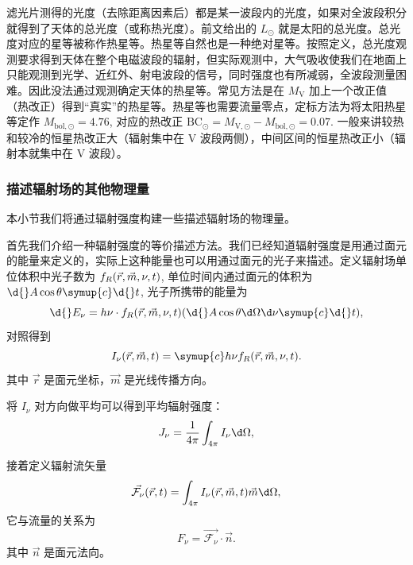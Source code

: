 \documentclass[../天体物理基础.tex]{subfiles}
\begin{document}
滤光片测得的光度（去除距离因素后）都是某一波段内的光度，如果对全波段积分就得到了天体的总光度（或称热光度）。前文给出的 $L_{\odot}$ 就是太阳的总光度。总光度对应的星等被称作热星等。热星等自然也是一种绝对星等。按照定义，总光度观测要求得到天体在整个电磁波段的辐射，但实际观测中，大气吸收使我们在地面上只能观测到光学、近红外、射电波段的信号，同时强度也有所减弱，全波段测量困难。因此没法通过观测确定天体的热星等。常见方法是在 $M_{\mathrm{V}}$ 加上一个改正值（热改正）得到“真实”的热星等。热星等也需要流量零点，定标方法为将太阳热星等定作 $M_{\mathrm{bol},\odot}=4.76$, 对应的热改正 $\mathrm{BC}_{\odot}=M_{\mathrm{V},\odot}-M_{\mathrm{bol},\odot}=0.07$. 一般来讲较热和较冷的恒星热改正大（辐射集中在 V 波段两侧），中间区间的恒星热改正小（辐射本就集中在 V 波段）。

\subsubsection{描述辐射场的其他物理量}
本小节我们将通过辐射强度构建一些描述辐射场的物理量。

首先我们介绍一种辐射强度的等价描述方法。我们已经知道辐射强度是用通过面元的能量来定义的，实际上这种能量也可以用通过面元的光子来描述。定义辐射场单位体积中光子数为 $f_{R}\mleft(\vec{r},\vec{m},\nu, t\mright)$, 单位时间内通过面元的体积为 $\d{}A\cos{\theta}\symup{c}\d{}t$, 光子所携带的能量为
\begin{equation}
\d{}E_{\nu}=h\nu\cdot f_{R}\mleft(\vec{r},\vec{m},\nu, t\mright)\mleft(\d{}A\cos{\theta}\d\Omega\d\nu\symup{c}\d{}t\mright),
\end{equation}
对照得到
\begin{equation}
I_{\nu}\mleft(\vec{r},\vec{m}, t\mright)=\symup{c}h\nu f_{R}\mleft(\vec{r},\vec{m},\nu, t\mright).
\end{equation}
其中 $\vec{r}$ 是面元坐标，$\vec{m}$ 是光线传播方向。

将 $I_{\nu}$ 对方向做平均可以得到平均辐射强度：
\begin{equation}
J_{\nu}=\frac{1}{4\pi}\int_{4\pi}I_{\nu}\d\Omega,
\end{equation}

接着定义辐射流矢量
\begin{equation}
\vec{\mathcal{F}_{\nu}}\mleft(\vec{r}, t\mright)=\int_{4\pi}I_{\nu}\mleft(\vec{r},\vec{m}, t\mright)\vec{m}\d\Omega,
\end{equation}
它与流量的关系为
\begin{equation}
F_{\nu}=\vec{\mathcal{F}_{\nu}}\cdot\vec{n}.
\end{equation}
其中 $\vec{n}$ 是面元法向。
\end{document}

